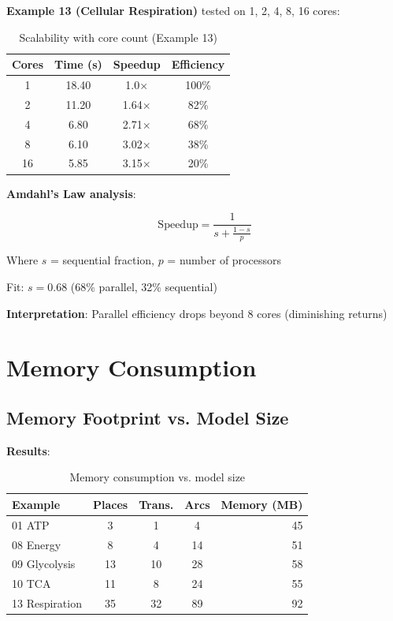\textbf{Example 13 (Cellular Respiration)} tested on 1, 2, 4, 8, 16 cores:

\begin{table}[h]
\centering
\begin{tabular}{@{}cccc@{}}
\toprule
\textbf{Cores} & \textbf{Time (s)} & \textbf{Speedup} & \textbf{Efficiency} \\
\midrule
1 & 18.40 & 1.0$\times$ & 100\% \\
2 & 11.20 & 1.64$\times$ & 82\% \\
4 & 6.80 & 2.71$\times$ & 68\% \\
8 & 6.10 & 3.02$\times$ & 38\% \\
16 & 5.85 & 3.15$\times$ & 20\% \\
\bottomrule
\end{tabular}
\caption{Scalability with core count (Example 13)}
\label{tab:core-scalability}
\end{table}

\textbf{Amdahl's Law analysis}:

\begin{equation}
\text{Speedup} = \frac{1}{s + \frac{1-s}{p}}
\end{equation}

Where $s$ = sequential fraction, $p$ = number of processors

Fit: $s = 0.68$ (68\% parallel, 32\% sequential)

\textbf{Interpretation}: Parallel efficiency drops beyond 8 cores (diminishing returns)

\section{Memory Consumption}
\label{sec:memory-consumption}

\subsection{Memory Footprint vs. Model Size}
\label{subsec:memory-footprint}

\textbf{Results}:

\begin{table}[h]
\centering
\begin{tabular}{@{}lcccr@{}}
\toprule
\textbf{Example} & \textbf{Places} & \textbf{Trans.} & \textbf{Arcs} & \textbf{Memory (MB)} \\
\midrule
01 ATP & 3 & 1 & 4 & 45 \\
08 Energy & 8 & 4 & 14 & 51 \\
09 Glycolysis & 13 & 10 & 28 & 58 \\
10 TCA & 11 & 8 & 24 & 55 \\
13 Respiration & 35 & 32 & 89 & 92 \\
\bottomrule
\end{tabular}
\caption{Memory consumption vs. model size}
\label{tab:memory-consumption}
\end{table}

